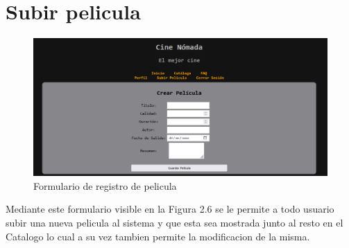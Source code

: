 \documentclass{report}
\begin{document}
        \clearpage
        \section{Subir pelicula} 
            \begin{figure}[h!]
                \centering
                \includegraphics[width=\textwidth]{./img/ui/subirp.png}
                \caption{Formulario de registro de pelicula}
            \end{figure}
            Mediante este formulario visible en la Figura 2.6 se le permite a todo usuario subir una nueva pelicula al sistema y que esta sea mostrada junto al resto en el Catalogo lo cual a su vez tambien permite la modificacion de la misma.
\end{document}
